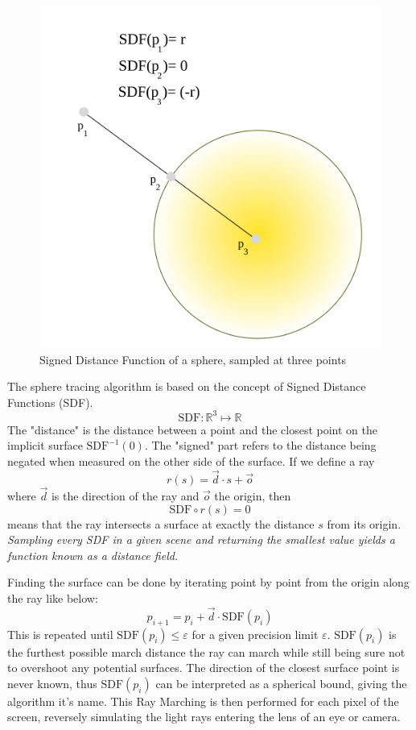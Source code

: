 		\begin{figure}
			\begin{flushright}
				\includegraphics[width=0.9\linewidth]{figure/SDF} 
			\end{flushright}
			\caption{ Signed Distance Function of a sphere, sampled at three points}
			\vspace{40pt}
		\end{figure}
		
		The sphere tracing algorithm is based on the concept of Signed Distance Functions (SDF).
		$$\text{SDF}:\mathbb{R}^{3}\mapsto\mathbb{R}$$ 
		The "distance" is the distance between a point and the closest point on the implicit surface $\text{SDF}^{-1}(0)$. 
		The "signed" part refers to the
		distance being negated when measured on the other side of the
		surface. If we define a ray $$r(s) = \vec{d} \cdot s + \vec{o}$$
		where $\vec{d}$ is the direction of the ray and $\vec{o}$ the 
		origin, then $$\text{SDF}\circ r(s) = 0$$ means that the ray
		intersects a surface at exactly the distance $s$ from its origin.
		\emph{ Sampling every SDF in a given scene and returning the smallest 
			value yields a function known as a distance field.
		}

		\bigskip
		\noindent Finding the surface can be done by iterating point by point from the
		origin along the ray like below: $$p_{i+1} = p_i + \vec{d}\cdot
		\text{SDF}(p_i)$$ This is repeated until $\text{SDF}(p_i) \leq
		\varepsilon$ for a given precision limit $\varepsilon$.
		$\text{SDF}(p_i)$ is the furthest possible march distance the ray can 
		march while still being sure not to overshoot any potential surfaces.  
		The direction of the closest surface point is never known, thus 
		$\text{SDF}(p_i)$ can be interpreted as a spherical bound, giving the 
		algorithm it's name. This Ray Marching is then performed for each pixel 
		of the screen, reversely simulating the light rays entering the lens of 
		an eye or camera.
			
